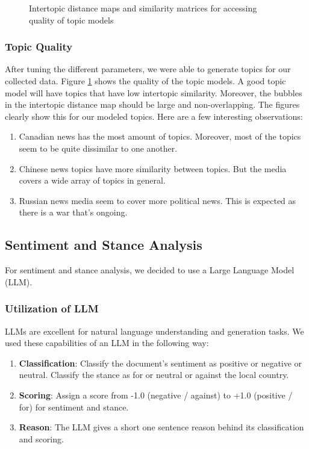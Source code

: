 \documentclass{article}
\theoremstyle{mytheoremstyle}
\theoremstyle{mytheoremstyle}
\theoremstyle{myproblemstyle}
\begin{document}
\begin{figure}[hp]
        \caption{Intertopic distance maps and similarity matrices for accessing quality of topic models}
        \label{fig:topic_model_quality}
    \end{figure}

    \subsubsection{Topic Quality}
    After tuning the different parameters, we were able to generate topics for our collected data. Figure \ref{fig:topic_model_quality} shows the quality of the topic models. A good topic model will have topics that have low intertopic similarity. Moreover, the bubbles in the intertopic distance map should be large and non-overlapping. The figures clearly show this for our modeled topics. Here are a few interesting observations:

    \begin{enumerate}
        \item Canadian news has the most amount of topics. Moreover, most of the topics seem to be quite dissimilar to one another.
        \item Chinese news topics have more similarity between topics. But the media covers a wide array of topics in general.
        \item Russian news media seem to cover more political news. This is expected as there is a war that's ongoing.
    \end{enumerate}

    \subsection{Sentiment and Stance Analysis}

    For sentiment and stance analysis, we decided to use a Large Language Model (LLM). 
    
    \subsubsection{Utilization of LLM}
    LLMs are excellent for natural language understanding and generation tasks. \cite{boiko2023emergent} We used these capabilities of an LLM in the following way:

    \begin{enumerate}
        \item \textbf{Classification}: Classify the document's sentiment as positive or negative or neutral. Classify the stance as for or neutral or against the local country.
        \item \textbf{Scoring}: Assign a score from -1.0 (negative / against) to +1.0 (positive / for) for sentiment and stance.
        \item \textbf{Reason}: The LLM gives a short one sentence reason behind its classification and scoring.
    \end{enumerate}
\end{document}
